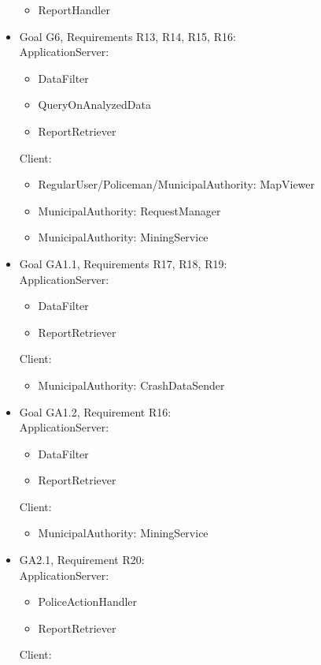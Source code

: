 \begin{itemize}
	\begin{itemize}
		\item ReportHandler
	\end{itemize}
	\item Goal G6, Requirements R13, R14, R15, R16:\\ApplicationServer:
	\begin{itemize}
		\item DataFilter
		\item QueryOnAnalyzedData
		\item ReportRetriever
	\end{itemize}
	\newpage
	Client:
	\begin{itemize}
		\item RegularUser/Policeman/MunicipalAuthority: MapViewer
		\item MunicipalAuthority: RequestManager
		\item MunicipalAuthority: MiningService
	\end{itemize}
	\item Goal GA1.1, Requirements R17, R18, R19:\\
	ApplicationServer:
	\begin{itemize}
		\item DataFilter
		\item ReportRetriever
	\end{itemize}
	Client:
	\begin{itemize}
		\item MunicipalAuthority: CrashDataSender
	\end{itemize}
	\item Goal GA1.2, Requirement R16:\\
	ApplicationServer:
	\begin{itemize}
		\item DataFilter
		\item ReportRetriever
	\end{itemize}
	Client:
	\begin{itemize}
		\item MunicipalAuthority: MiningService
	\end{itemize}
	\item GA2.1, Requirement R20:\\
	ApplicationServer:
	\begin{itemize}
		\item PoliceActionHandler
		\item ReportRetriever
	\end{itemize}
	Client:
	\begin{itemize}

\end{itemize}
\end{itemize}
